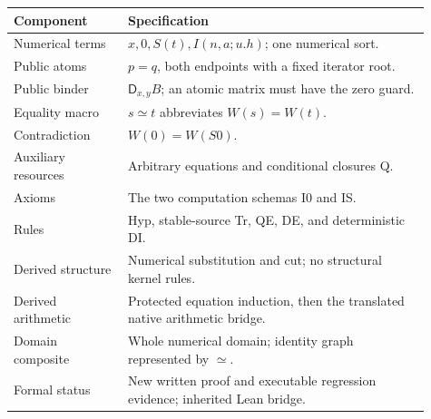 \documentclass[11pt,letterpaper]{article}
\theoremstyle{definition}\newtheorem{definition}[theorem]{Definition}
\theoremstyle{remark}\newtheorem{remark}[theorem]{Remark}
\newcommand{\D}{\mathsf D}\newcommand{\Q}{\mathsf Q}
\begin{document}
\begin{center}\small
\begin{tabular}{p{0.25\linewidth}p{0.66\linewidth}}
\toprule
Component & Specification\\
\midrule
Numerical terms & \(x,0,S(t),I(n,a;u.h)\); one numerical sort.\\
Public atoms & \(p=q\), both endpoints with a fixed iterator root.\\
Public binder & \(\D_{x,y}B\); an atomic matrix must have the zero guard.\\
Equality macro & \(s\simeq t\) abbreviates \(W(s)=W(t)\).\\
Contradiction & \(W(0)=W(S0)\).\\
Auxiliary resources & Arbitrary equations and conditional closures Q.\\
Axioms & The two computation schemas I0 and IS.\\
Rules & Hyp, stable-source Tr, QE, DE, and deterministic DI.\\
Derived structure & Numerical substitution and cut; no structural kernel rules.\\
Derived arithmetic & Protected equation induction, then the translated native arithmetic bridge.\\
Domain composite & Whole numerical domain; identity graph represented by \(\simeq\).\\
Formal status & New written proof and executable regression evidence; inherited Lean bridge.\\
\bottomrule
\end{tabular}
\end{center}
\end{document}
